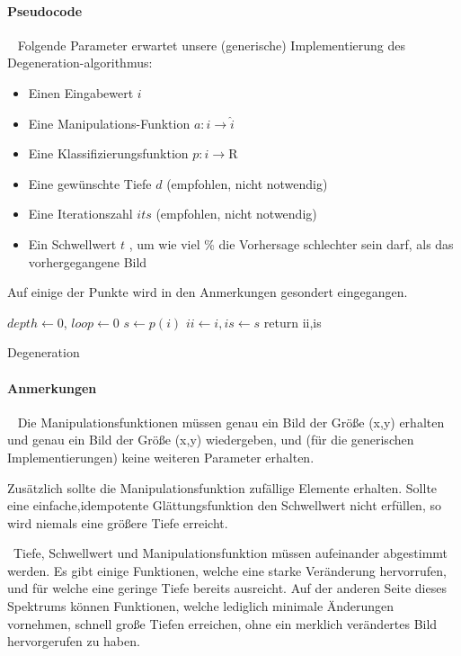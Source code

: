 \paragraph{Pseudocode} ~\newline 
Folgende Parameter erwartet unsere (generische) Implementierung des Degeneration-algorithmus: 
\begin{itemize}
	\item Einen Eingabewert $i$
	\item Eine Manipulations-Funktion $a : i \rightarrow \hat{i}$
	\item Eine Klassifizierungsfunktion $p : i \rightarrow \mathrm{R}$
	\item Eine gewünschte Tiefe $d$ (empfohlen, nicht notwendig)
	\item Eine Iterationszahl $its$ (empfohlen, nicht notwendig)
	\item Ein Schwellwert $t$ , um wie viel \% die Vorhersage schlechter sein darf, als das vorhergegangene Bild 
\end{itemize}
Auf einige der Punkte wird in den Anmerkungen gesondert eingegangen. ~\newline
\IncMargin{1em}
\begin{algorithm}
	\BlankLine
	$depth  \leftarrow 0$, $loop \leftarrow0$ \;
	$s \leftarrow p(i)$\;
	$ii \leftarrow i , is \leftarrow s$ \;
	return ii,is\;
	
	\caption{Degeneration}\label{algo_degen}
\end{algorithm}\DecMargin{1em}
\newpage
\paragraph{Anmerkungen}~\newline 
Die Manipulationsfunktionen müssen genau ein Bild der Größe (x,y) erhalten und genau ein Bild der Größe (x,y) wiedergeben, und (für die generischen Implementierungen) keine weiteren Parameter erhalten. 

Zusätzlich sollte die Manipulationsfunktion zufällige Elemente erhalten. Sollte eine einfache,idempotente Glättungsfunktion den Schwellwert nicht erfüllen, so wird niemals eine größere Tiefe erreicht.  

~\newline Tiefe, Schwellwert und Manipulationsfunktion müssen aufeinander abgestimmt werden. Es gibt einige Funktionen, welche eine starke Veränderung hervorrufen, und für welche eine geringe Tiefe bereits ausreicht. Auf der anderen Seite dieses Spektrums können Funktionen, welche lediglich minimale Änderungen vornehmen, schnell große Tiefen erreichen, ohne ein merklich verändertes Bild hervorgerufen zu haben. 

